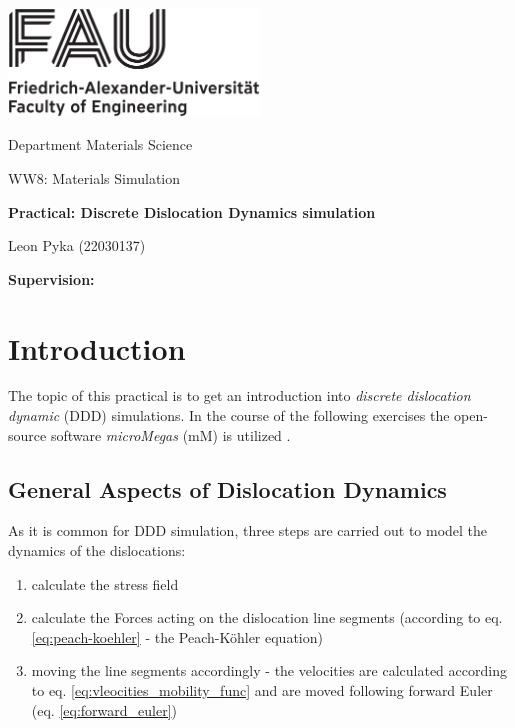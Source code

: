 




%
\begin{titlepage}
\begin{center}
\includegraphics[width=0.5\textwidth]{graphics/FAU_TechFak_EN_H_black.eps}

\LARGE Department Materials Science

\Large WW8: Materials Simulation

\LARGE \textbf{Practical: Discrete Dislocation Dynamics simulation}



\vfil
\Large Leon Pyka (22030137)



\Large \textbf{Supervision: }
\end{center}

\thispagestyle{empty}
%
\end{titlepage}
%

\setcounter{page}{1}

\tableofcontents
\newpage

\section{Introduction}
The topic of this practical is to get an introduction into \textit{discrete dislocation dynamic} (DDD)  simulations. In the course of the following exercises the open-source software \textit{microMegas} (mM) is utilized \cite{devincre2011}.  

\subsection{General Aspects of Dislocation Dynamics} 

As it is common for DDD simulation, three steps are carried out to model the dynamics of the dislocations:

\begin{enumerate}
	\item calculate the stress field 
	\item calculate the Forces acting on the dislocation line segments (according to eq. \ref{eq:peach-koehler} - the Peach-Köhler equation)
	\item moving the line segments accordingly - the velocities are calculated according to eq. \ref{eq:vleocities_mobility_func} and are moved following forward Euler (eq. \ref{eq:forward_euler})
\end{enumerate}

